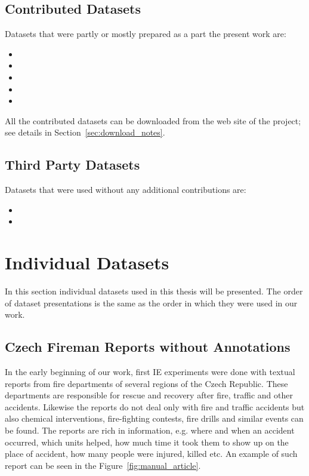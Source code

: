 \subsection{Contributed Datasets} \label{sec:data_contributed}
Datasets that were partly or mostly prepared as a part the present work are:


\begin{itemize}
	\item {}
	\item {}
	\item {}
	\item {}
	\item {}
\end{itemize}

All the contributed datasets can be downloaded from the web site of the project; see details in Section~\ref{sec:download_notes}.

\subsection{Third Party Datasets}

Datasets that were used without any additional contributions are:

\begin{itemize}
	\item {}
	\item {}
\end{itemize}


\section{Individual Datasets}
In this section individual datasets used in this thesis will be presented. The order of dataset presentations is the same as the order in which they were used in our work.

\subsection{Czech Fireman Reports without Annotations} \label{sec:data_fireman_without}
In the early beginning of our work, first IE experiments were done with textual reports from fire departments of several regions of the Czech Republic. These departments are responsible for rescue and recovery after fire, traffic and other accidents. Likewise the reports do not deal only with fire and traffic accidents but also chemical interventions, fire-fighting contests, fire drills and similar events can be found. The reports are rich in information, e.g. where and when an accident occurred, which units helped, how much time it took them to show up on the place of accident, how many people were injured, killed etc. An example of such report can be seen in the Figure~\ref{fig:manual_article}.

